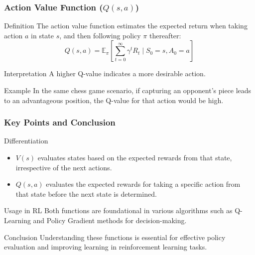 \documentclass[aspectratio=169]{beamer}
\begin{document}
\begin{frame}[fragile]
  \frametitle{Action Value Function ($Q(s, a)$)}

  \begin{block}{Definition}
    The action value function estimates the expected return when taking action $a$ in state $s$, and then following policy $\pi$ thereafter:
    \begin{equation}
      Q(s, a) = \mathbb{E}_{\pi}\left[\sum_{t=0}^{\infty} \gamma^t R_t \mid S_0 = s, A_0 = a\right]
    \end{equation}
  \end{block}

  \begin{block}{Interpretation}
    A higher Q-value indicates a more desirable action.
  \end{block}

  \begin{block}{Example}
    In the same chess game scenario, if capturing an opponent’s piece leads to an advantageous position, the Q-value for that action would be high.
  \end{block}
\end{frame}

\begin{frame}[fragile]
  \frametitle{Key Points and Conclusion}

  \begin{block}{Differentiation}
    \begin{itemize}
      \item $V(s)$ evaluates states based on the expected rewards from that state, irrespective of the next actions.
      \item $Q(s, a)$ evaluates the expected rewards for taking a specific action from that state before the next state is determined.
    \end{itemize}
  \end{block}

  \begin{block}{Usage in RL}
    Both functions are foundational in various algorithms such as Q-Learning and Policy Gradient methods for decision-making.
  \end{block}

  \begin{block}{Conclusion}
    Understanding these functions is essential for effective policy evaluation and improving learning in reinforcement learning tasks.
  \end{block}
\end{frame}
\end{document}
